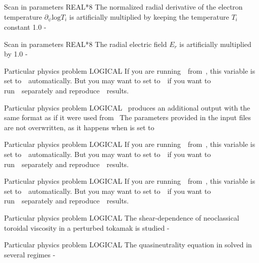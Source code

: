{Scan in parameters}
{REAL*8}
{The normalized radial derivative of the electron temperature $\partial_\psi\mathrm{log}T_i$ is artificially multiplied by  keeping the temperature $T_i$ constant}
{1.0}
{-}
{}

{Scan in parameters}
{REAL*8}
{The radial electric field $E_r$ is artificially multiplied by }
{1.0}
{-}
{}

{Particular physics problem}
{LOGICAL}
{}
{\false}
{If you are running~\KNOSOS~from~\TASKTD, this variable is set to~\true~automatically. But you may want to set  to~\true~if you want to run~\KNOSOS~separately and reproduce~\TASKTD~results.}
{\citep{yokoyama2017task3d}}

{Particular physics problem}
{LOGICAL}
{\KNOSOS~produces an additional output with the same format as if it were used from~\TASKTD}
{\false}
{The parameters provided in the input files are not overwritten, as it happens when  is set to~\true}
{}

{Particular physics problem}
{LOGICAL}
{}
{\false}
{If you are running~\KNOSOS~from~\PENTA, this variable is set to~\true~automatically. But you may want to set  to~\true~if you want to run~\KNOSOS~separately and reproduce~\PENTA~results.}
{\citep{spong2005flow}}

{Particular physics problem}
{LOGICAL}
{}
{\false}
{If you are running~\KNOSOS~from~\NEOTRANSP, this variable is set to~\true~automatically. But you may want to set  to~\true~if you want to run~\KNOSOS~separately and reproduce~\NEOTRANSP~results.}
{}

{Particular physics problem}
{LOGICAL}
{The shear-dependence of neoclassical toroidal viscosity in a perturbed tokamak is studied}
{\false}
{-}
{\citep{satake2018iaea}}


{Particular physics problem}
{LOGICAL}
{The quasineutrality equation in solved in several regimes}
{\false}
{-}
{\citep{calvo2018jpp}}



